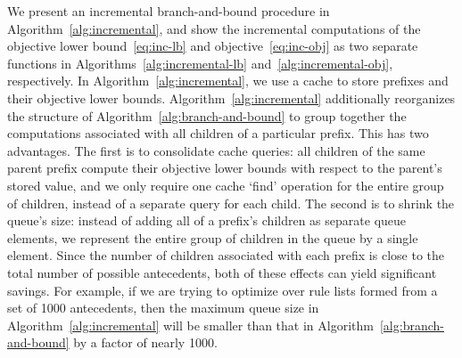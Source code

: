 \begin{arxiv}
We present an incremental branch-and-bound procedure in
Algorithm~\ref{alg:incremental}, and show the incremental computations
of the objective lower bound~\eqref{eq:inc-lb} and objective~\eqref{eq:inc-obj}
as two separate functions in Algorithms~\ref{alg:incremental-lb}
and~\ref{alg:incremental-obj}, respectively.
%
In Algorithm~\ref{alg:incremental}, we use a cache to store
prefixes and their objective lower bounds.
%
Algorithm~\ref{alg:incremental} additionally reorganizes the structure
of Algorithm~\ref{alg:branch-and-bound} to group together the computations
associated with all children of a particular prefix.
%
This has two advantages.
%
The first is to consolidate cache queries: all children of the same
parent prefix compute their objective lower bounds with respect to
the parent's stored value, and we only require one cache `find' operation
for the entire group of children, instead of a separate query for each child.
%
The second is to shrink the queue's size:
instead of adding all of a prefix's children as separate queue elements,
we represent the entire group of children in the queue by a single element.
%
Since the number of children associated with each prefix
is close to the total number of possible antecedents,
both of these effects can yield significant savings.
%
For example, if we are trying to optimize over rule lists formed
from a set of 1000 antecedents, then the maximum queue size in
Algorithm~\ref{alg:incremental} will be smaller than that in
Algorithm~\ref{alg:branch-and-bound} by a factor of nearly 1000.

\end{arxiv}
